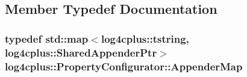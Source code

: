 \subsection{Member Typedef Documentation}
\hypertarget{classlog4cplus_1_1PropertyConfigurator_a8348301eeeee11e2c7c121f3ccb5c283}{
\subsubsection[{Appender\-Map}]{\setlength{\rightskip}{0pt plus 5cm}typedef std\-::map$<${\bf log4cplus\-::tstring}, {\bf log4cplus\-::\-Shared\-Appender\-Ptr}$>$ {\bf log4cplus\-::\-Property\-Configurator\-::\-Appender\-Map}\hspace{0.3cm}{\ttfamily [protected]}}}\label{classlog4cplus_1_1PropertyConfigurator_a8348301eeeee11e2c7c121f3ccb5c283}


